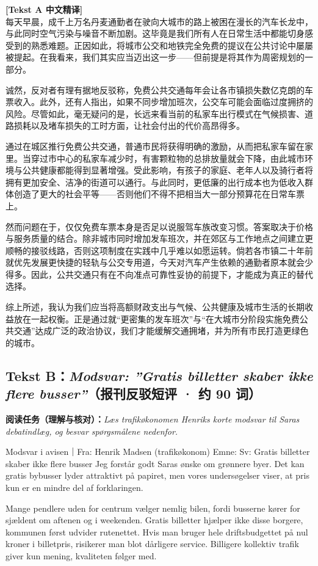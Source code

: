 \begin{transbox}
\small
\textbf{\color{NCDTeal}[Tekst A 中文精译]}\\
每天早晨，成千上万名丹麦通勤者在驶向大城市的路上被困在漫长的汽车长龙中，与此同时空气污染与噪音不断加剧。这毕竟是我们所有人在日常生活中都能切身感受到的熟悉难题。正因如此，将城市公交和地铁完全免费的提议在公共讨论中屡屡被提起。在我看来，我们其实应当迈出这一步——但前提是将其作为周密规划的一部分。

诚然，反对者有理有据地反驳称，免费公共交通每年会让各市镇损失数亿克朗的车票收入。此外，还有人指出，如果不同步增加班次，公交车可能会面临过度拥挤的风险。尽管如此，毫无疑问的是，长远来看当前的私家车出行模式在气候损害、道路损耗以及堵车损失的工时方面，让社会付出的代价高昂得多。

通过在城区推行免费公共交通，普通市民将获得明确的激励，从而把私家车留在家里。当穿过市中心的私家车减少时，有害颗粒物的总排放量就会下降，由此城市环境与公共健康都能得到显著增强。受此影响，有孩子的家庭、老年人以及骑行者将拥有更加安全、洁净的街道可以通行。与此同时，更低廉的出行成本也为低收入群体创造了更大的社会平等——否则他们不得不把相当大一部分预算花在日常车票上。

然而问题在于，仅仅免费车票本身是否足以说服驾车族改变习惯。答案取决于价格与服务质量的结合。除非城市同时增加发车班次，并在郊区与工作地点之间建立更顺畅的接驳线路，否则这项制度在实践中几乎难以如愿运转。倘若各市镇二十年前就优先发展更快捷的轻轨与公交专用道，今天对汽车产生依赖的通勤者原本就会少得多。因此，公共交通只有在不向准点可靠性妥协的前提下，才能成为真正的替代选择。

综上所述，我认为我们应当将高额财政支出与气候、公共健康及城市生活的长期收益放在一起权衡。正是通过就“更密集的发车班次”与“在大城市分阶段实施免费公共交通”达成广泛的政治协议，我们才能缓解交通拥堵，并为所有市民打造更绿色的城市。
\end{transbox}

\subsection*{Tekst B：\textit{Modsvar: ”Gratis billetter skaber ikke flere busser”}（报刊反驳短评 · 约 90 词）}

\textbf{阅读任务（理解与核对）：}\textit{Læs trafikøkonomen Henriks korte modsvar til Saras debatindlæg, og besvar spørgsmålene nedenfor.}

\begin{emailbox}{Modsvar i avisen｜Fra: Henrik Madsen (trafikøkonom) \quad Emne: Sv: Gratis billetter skaber ikke flere busser}
Jeg forstår  godt Saras ønske om grønnere byer. Det kan  gratis bybusser lyder attraktivt på papiret, men vores undersøgelser viser, at pris kun er en mindre del af forklaringen.

Mange pendlere uden for centrum vælger nemlig bilen, fordi busserne kører for sjældent om aftenen og i weekenden. Gratis billetter hjælper ikke disse borgere,  kommunen først udvider rutenettet. Hvis man bruger hele driftsbudgettet på nul kroner i billetpris, risikerer man blot dårligere service. Billigere kollektiv trafik giver kun mening,  kvaliteten følger med.
\end{emailbox}

